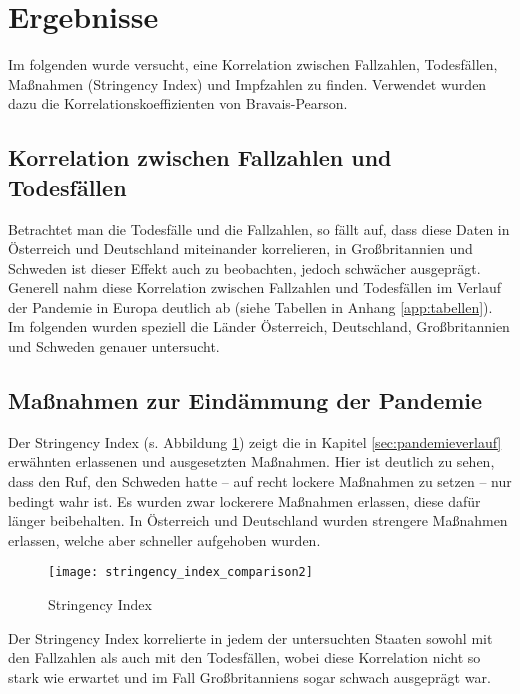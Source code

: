 \section{Ergebnisse}

Im folgenden wurde versucht, eine Korrelation zwischen Fallzahlen, Todesfällen, Maßnahmen (Stringency Index) und Impfzahlen zu finden. Verwendet wurden dazu die Korrelationskoeffizienten von Bravais-Pearson.

\subsection{Korrelation zwischen Fallzahlen und Todesfällen}

Betrachtet man die Todesfälle und die Fallzahlen, so fällt auf, dass diese Daten in Österreich und Deutschland miteinander korrelieren, in Großbritannien und Schweden ist dieser Effekt auch zu beobachten, jedoch schwächer ausgeprägt. Generell nahm diese Korrelation zwischen Fallzahlen und Todesfällen im Verlauf der Pandemie in Europa deutlich ab (siehe Tabellen in Anhang \ref{app:tabellen}). Im folgenden wurden speziell die Länder Österreich, Deutschland, Großbritannien und Schweden genauer untersucht.

\subsection{Maßnahmen zur Eindämmung der Pandemie}
\label{sec:massnahmen}

Der Stringency Index (s. Abbildung \ref{fig:stringency_index_comparison}) zeigt die in Kapitel \ref{sec:pandemieverlauf} erwähnten erlassenen und ausgesetzten Maßnahmen. Hier ist deutlich zu sehen, dass den Ruf, den Schweden hatte -- auf recht lockere Maßnahmen zu setzen -- nur bedingt wahr ist. Es wurden zwar lockerere Maßnahmen erlassen, diese dafür länger beibehalten. 
In Österreich und Deutschland wurden strengere Maßnahmen erlassen, welche aber schneller aufgehoben wurden.

\begin{figure}[ht]
    \caption{Stringency Index}
    \label{fig:stringency_index_comparison}
    \centering
    \texttt{[image: stringency\_index\_comparison2]}
\end{figure}

Der Stringency Index korrelierte in jedem der untersuchten Staaten sowohl mit den Fallzahlen als auch mit den Todesfällen, wobei diese Korrelation nicht so stark wie erwartet und im Fall Großbritanniens sogar schwach ausgeprägt war.


